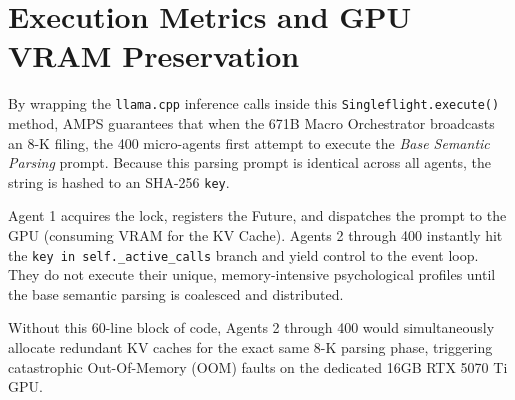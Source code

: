 \section{Execution Metrics and GPU VRAM Preservation}

By wrapping the \texttt{llama.cpp} inference calls inside this \texttt{Singleflight.execute()} method, AMPS guarantees that when the 671B Macro Orchestrator broadcasts an 8-K filing, the 400 micro-agents first attempt to execute the \textit{Base Semantic Parsing} prompt. Because this parsing prompt is identical across all agents, the string is hashed to an SHA-256 \texttt{key}. 

Agent 1 acquires the lock, registers the Future, and dispatches the prompt to the GPU (consuming VRAM for the KV Cache). Agents 2 through 400 instantly hit the \texttt{key in self.\_active\_calls} branch and yield control to the event loop. They do not execute their unique, memory-intensive psychological profiles until the base semantic parsing is coalesced and distributed. 

Without this 60-line block of code, Agents 2 through 400 would simultaneously allocate redundant KV caches for the exact same 8-K parsing phase, triggering catastrophic Out-Of-Memory (OOM) faults on the dedicated 16GB RTX 5070 Ti GPU.
